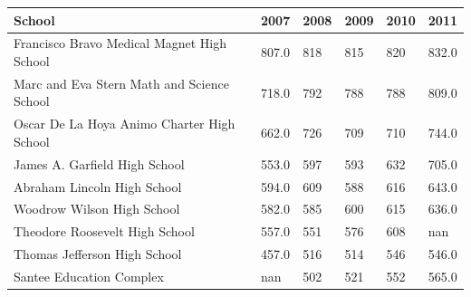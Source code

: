 \documentclass{article}
\begin{document}
\begin{tabular}{llllll}
\toprule
School & 2007 & 2008 & 2009 & 2010 & 2011 \\
\midrule
Francisco Bravo Medical Magnet High School & 807.0 & 818 & 815 & 820 & 832.0 \\
Marc and Eva Stern Math and Science School & 718.0 & 792 & 788 & 788 & 809.0 \\
Oscar De La Hoya Animo Charter High School & 662.0 & 726 & 709 & 710 & 744.0 \\
James A. Garfield High School & 553.0 & 597 & 593 & 632 & 705.0 \\
Abraham Lincoln High School & 594.0 & 609 & 588 & 616 & 643.0 \\
Woodrow Wilson High School & 582.0 & 585 & 600 & 615 & 636.0 \\
Theodore Roosevelt High School & 557.0 & 551 & 576 & 608 & nan \\
Thomas Jefferson High School & 457.0 & 516 & 514 & 546 & 546.0 \\
Santee Education Complex & nan & 502 & 521 & 552 & 565.0 \\
\bottomrule
\end{tabular}
\end{document}
